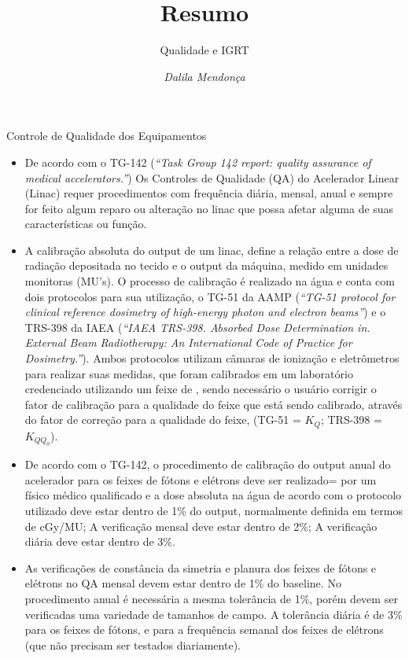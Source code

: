 \documentclass[11pt,a4paper]{article}
\title{Resumo}
\author{Qualidade e IGRT \nocite{*}}
\date{\textit{Dalila Mendonça}}
\newcounter{exemplo}
\begin{document}
	\maketitle


\begin{exemplo}[11. Qualidade ]

    \textcolor{CarnationPink}{Controle de Qualidade dos Equipamentos}
    \begin{itemize}
        \item De acordo com o TG-142 (\textit{``Task Group 142 report: quality assurance of medical accelerators.''}) Os Controles de Qualidade  (QA) do Acelerador Linear (Linac) requer procedimentos com frequência diária, mensal, anual e sempre for feito algum reparo ou alteração no linac que possa afetar alguma de suas características ou função.
        
        \item A calibração absoluta do output de um linac, define a relação entre a dose de radiação depositada no tecido e o output da máquina, medido em unidades monitoras (MU's). O processo de calibração é realizado na água e conta com dois protocolos para sua utilização, o TG-51 da AAMP (\textit{``TG-51 protocol for clinical reference dosimetry of high-energy photon and electron beams''}) e o TRS-398 da IAEA (\textit{``IAEA TRS-398. Absorbed Dose Determination in. External Beam Radiotherapy: An International Code of Practice for Dosimetry.''}). Ambos protocolos utilizam câmaras de ionização e eletrômetros para realizar suas medidas, que foram calibrados em um laboratório credenciado utilizando um feixe de , sendo necessário o usuário corrigir o fator de calibração para a qualidade do feixe que está sendo calibrado, através do fator de correção para a qualidade do feixe, (TG-51 = $K_Q$; TRS-398 = $K_{QQ_0}$).
        
        \item De acordo com o TG-142, o procedimento de calibração do output anual do acelerador para os feixes de fótons e elétrons deve ser realizado= por um físico médico qualificado e a dose absoluta na água de acordo com o protocolo utilizado deve estar dentro de 1\% do output, normalmente definida em termos de cGy/MU; A verificação mensal deve estar dentro de 2\%; A verificação diária deve estar dentro de 3\%. 
        \item As verificações de constância da simetria e planura dos feixes de fótons e elétrons no QA mensal devem estar dentro de 1\% do baseline. No procedimento anual é necessária a mesma tolerância de 1\%, porém devem ser verificadas uma variedade de tamanhos de campo. A tolerância diária é de 3\% para os feixes de fótons, e para a frequência semanal dos feixes de elétrons (que não precisam ser testados diariamente).
        

\end{itemize}
\end{exemplo}
\end{document}
